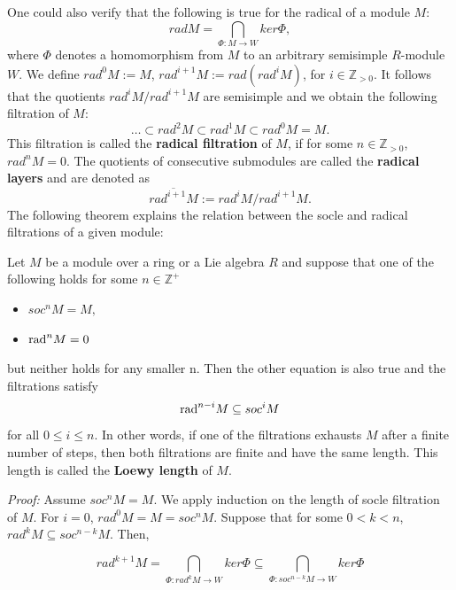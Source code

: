  One could also verify that the following is true for the radical of a module $M:$ $$rad M=\bigcap_{\Phi:M\rightarrow W}ker\Phi,$$
where $\Phi$ denotes a homomorphism from $M$ to an arbitrary semisimple $R$-module $W$. We define $rad^0M:=M$, $rad^{i+1}M:=rad(rad^iM)$,  for $i\in\mathbb{Z}_{>0}$. It follows that the quotients $rad^iM/rad^{i+1}M$ are semisimple and we obtain the following filtration of $M$:
$$\dots \subset rad^2M \subset rad^1M\subset rad^0M=M.$$
This filtration is called the \textbf{radical filtration} of $M$, if for some $n\in\mathbb{Z}_{>0}$, $rad^nM=0$.
The quotients of consecutive submodules are called the \textbf{radical layers} and are denoted as $$\overline{rad^{i+1}M}:=rad^iM/rad^{i+1}M.$$
The following theorem explains the relation between the socle and radical filtrations of a given module:

\begin{thm}
Let $M$ be a module over a ring or a Lie algebra $R$ and suppose that one of the following holds for some $n\in \mathbb{Z}^{+}$
 \begin{itemize}
 \item{$soc^n M=M,$}
 \item{$\textnormal{rad}^n M=0$}
 \end{itemize}
 but neither holds for any smaller n. Then the other equation is also true and the filtrations satisfy
 $$\textnormal{rad}^{n-i} M \subseteq soc^i M$$
 for all  \hspace{1mm}$0\leq i \leq n$.
 In other words, if one of the filtrations exhausts $M$ after a finite number of steps, then both filtrations are finite and have the same length. This length is called the \textbf{Loewy length} of $M$.
\end{thm}
\emph{Proof:} Assume $soc^nM=M$. We apply induction on the length of socle filtration of $M$. For $i=0$, $ rad^{0}M=M=soc^nM$. Suppose that for some $0<k<n $, $ rad^kM\subseteq soc^{n-k}M$. Then,

$$rad^{k+1}M=\bigcap_{\Phi:rad^kM\rightarrow W}ker\Phi\subseteq \bigcap_{\Phi:soc^{n-k}M\rightarrow W}ker\Phi$$

